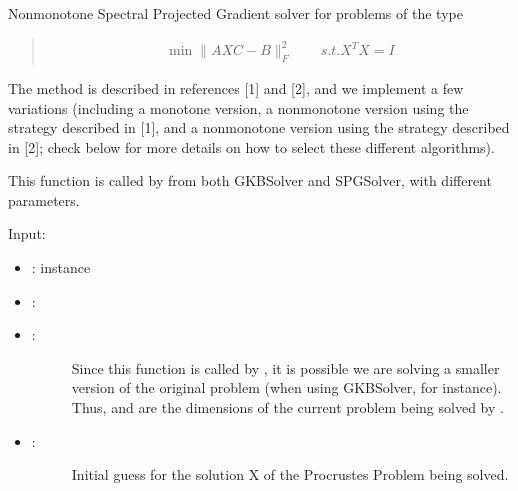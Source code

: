 \documentclass[a4paper,10pt,english]{sphinxmanual}
\begin{document}

\begin{fulllineitems}
\label{\detokenize{skprocrustes:skprocrustes.spectral_solver}}
Nonmonotone Spectral Projected Gradient solver for problems of the type
\begin{quote}
\begin{equation*}
\begin{split}\min \lVert AXC - B\rVert_F^2  \qquad s.t. X^TX = I\end{split}
\end{equation*}\end{quote}

The method is described in references {[}1{]} and {[}2{]}, and we implement a few
variations (including a monotone version, a nonmonotone version using the 
strategy described in {[}1{]}, and a nonmonotone version using the strategy 
described in {[}2{]}; check below for more details on how to select these 
different algorithms).

This function is called by  from both GKBSolver and
SPGSolver, with different parameters.

Input:
\begin{itemize}
\item {} 
:  instance

\item {} 
: 

\item {} \begin{description}
\item[{: }] \leavevmode
Since this function is called by , it is possible
we are solving a smaller version of the original problem (when using
GKBSolver, for instance). Thus,  and  are the
dimensions of the current problem being solved by .

\end{description}

\item {} \begin{description}
\item[{: }] \leavevmode
Initial guess for the solution X of the Procrustes Problem being solved.


\end{description}
\end{itemize}
\end{fulllineitems}
\end{document}
